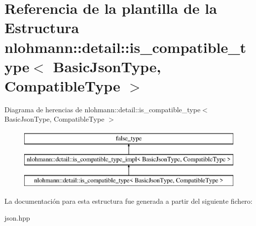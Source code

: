 \hypertarget{structnlohmann_1_1detail_1_1is__compatible__type}{}\section{Referencia de la plantilla de la Estructura nlohmann\+:\+:detail\+:\+:is\+\_\+compatible\+\_\+type$<$ Basic\+Json\+Type, Compatible\+Type $>$}
\label{structnlohmann_1_1detail_1_1is__compatible__type}
Diagrama de herencias de nlohmann\+:\+:detail\+:\+:is\+\_\+compatible\+\_\+type$<$ Basic\+Json\+Type, Compatible\+Type $>$\begin{figure}[H]
\begin{center}
\leavevmode
\includegraphics[height=3.000000cm]{structnlohmann_1_1detail_1_1is__compatible__type}
\end{center}
\end{figure}


La documentación para esta estructura fue generada a partir del siguiente fichero\+:\begin{DoxyCompactItemize}
\item 
json.\+hpp\end{DoxyCompactItemize}
